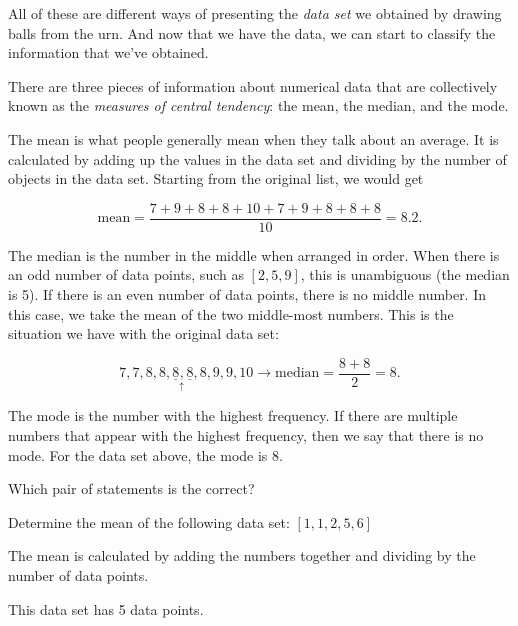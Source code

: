 \documentclass{ximera}
\begin{document}
All of these are different ways of presenting the \emph{data set} we obtained by drawing balls from the urn. And now that we have the data, we can start to classify the information that we've obtained.

There are three pieces of information about numerical data that are collectively known as the \emph{measures of central tendency}: the mean, the median, and the mode.

The mean is what people generally mean when they talk about an average. It is calculated by adding up the values in the data set and dividing by the number of objects in the data set. Starting from the original list, we would get

\[ \text{mean} = \dfrac{7 + 9 + 8 + 8 + 10 + 7 + 9 + 8 + 8 + 8}{10} = 8.2. \]

The median is the number in the middle when arranged in order. When there is an odd number of data points, such as $[2, 5, 9]$, this is unambiguous (the median is 5). If there is an even number of data points, there is no middle number. In this case, we take the mean of the two middle-most numbers. This is the situation we have with the original data set:

\[ 7, 7, 8, 8, \underline{8} \underset{\uparrow}{,} \underline{8}, 8, 9, 9, 10 \rightarrow \text{median} = \dfrac{8 + 8}{2} = 8. \]

The mode is the number with the highest frequency. If there are multiple numbers that appear with the highest frequency, then we say that there is no mode. For the data set above, the mode is 8.

\begin{question}
Which pair of statements is the correct?
  \begin{solution}
    \begin{multiple-choice}
    \end{multiple-choice}
  \end{solution}
\end{question}

\begin{question}
Determine the mean of the following data set: $[1, 1, 2, 5, 6]$
  \begin{solution}
    \begin{multiple-choice}
    \end{multiple-choice}
    \begin{hint}
      The mean is calculated by adding the numbers together and dividing by the number of data points.
    \end{hint}
    \begin{hint}
      This data set has 5 data points.
    \end{hint}
  \end{solution}
\end{question}
\end{document}
